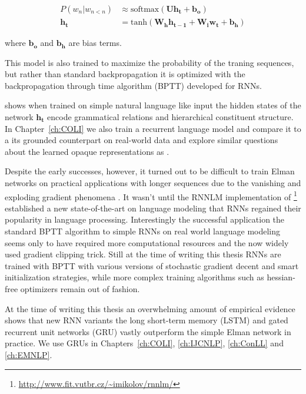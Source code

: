 \begin{align}
P(w_n|w_{n<n}) &\approx \text{softmax}(\mathbf{U} \mathbf{h_t} + \mathbf{b_o}) \\
\mathbf{h_t} &= \text{tanh}(\mathbf{W_h}\mathbf{h_{t-1}} + \mathbf{W_i}\mathbf{w_t} + \mathbf{b_h})
\end{align}

where $ \mathbf{b_o}$ and $ \mathbf{b_h}$ are bias terms.

This model is also trained to maximize the probability of the traning sequences, but rather than standard
backpropagation it is optimized with the backpropagation through time algorithm (BPTT)
\citep{robinson1987utility,werbos1988generalization,williams1995gradient} developed for RNNs.

\cite{elman1991distributed} shows when trained on simple natural language like input the
hidden states of the network $\mathbf{h_t}$ encode grammatical relations and hierarchical
constituent structure. In Chapter~\ref{ch:COLI} we also train a recurrent language model
and compare it to a its grounded counterpart 
on real-world data and explore similar questions about the learned opaque representations 
as \cite{elman1991distributed} .

Despite the early successes, however, it turned out to be difficult to train
Elman networks on practical applications with longer sequences
due to the vanishing and exploding gradient phenomena \citep{bengio1994learning}.
It  wasn't until the RNNLM implementation of \cite{mikolov2010recurrent}\footnote{\url{http://www.fit.vutbr.cz/~imikolov/rnnlm/}}
established a new state-of-the-art on language modeling that RNNs regained their popularity
in language processing.  Interestingly the successful
application the standard BPTT algorithm
to simple RNNs on real world language modeling \cite{mikolov2012statistical}
seems  only to have required more computational resources and 
the now widely used gradient clipping trick. Still at the time of writing this thesis RNNs are
trained with BPTT with various versions of stochastic gradient decent and smart initialization
strategies, while more complex training algorithms such as hessian-free optimizers 
\citep{martens2011learning} remain out of fashion.

At the time of writing this thesis an overwhelming amount of empirical evidence
shows that new RNN variants the long short-term 
memory (LSTM) \citep{hochreiter1997long,gers1999learning}
and gated recurrent unit networks (GRU) \citep{cho2014learning}
vastly outperform the simple Elman network in practice. We use GRUs in
Chapters~\ref{ch:COLI}, \ref{ch:IJCNLP}, \ref{ch:ConLL} and \ref{ch:EMNLP}.

